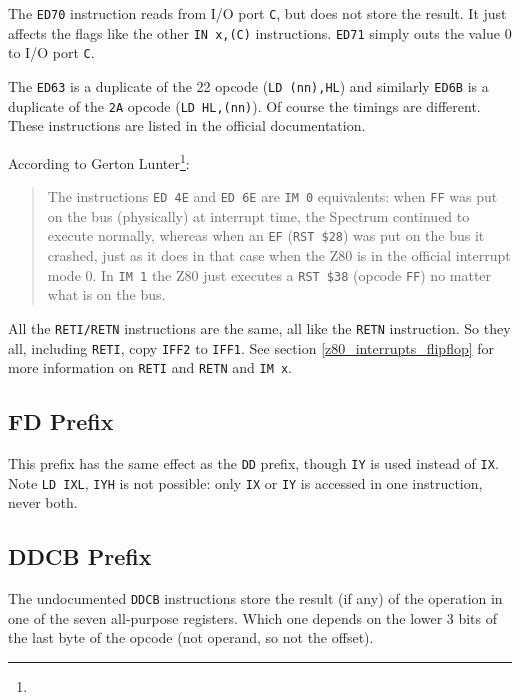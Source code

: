 The {\tt ED70} instruction reads from I/O port {\tt C}, but does not store the result. It just affects the flags like the other {\tt IN x,(C)} instructions. {\tt ED71} simply outs the value 0 to I/O port {\tt C}.

The {\tt ED63} is a duplicate of the 22 opcode ({\tt LD (nn),HL}) and similarly {\tt ED6B} is a duplicate of the {\tt 2A} opcode ({\tt LD HL,(nn)}). Of course the timings are different. These instructions are listed in the official documentation.

\pagebreak
According to Gerton Lunter\footnote{}:

\begin{quote}
	The instructions {\tt ED 4E} and {\tt ED 6E} are {\tt IM 0} equivalents: when {\tt FF} was put on the bus (physically) at interrupt time, the Spectrum continued to execute normally, whereas when an {\tt EF} ({\tt RST \$28}) was put on the bus it crashed, just as it does in that case when the Z80 is in the official interrupt mode 0. In {\tt IM 1} the Z80 just executes a {\tt RST \$38} (opcode {\tt FF}) no matter what is on the bus.
\end{quote}

All the {\tt RETI/RETN} instructions are the same, all like the {\tt RETN} instruction. So they all, including {\tt RETI}, copy {\tt IFF2} to {\tt IFF1}. See section \ref{z80_interrupts_flipflop} for more information on {\tt RETI} and {\tt RETN} and {\tt IM x}.


\subsection{FD Prefix \cite{gerton}}

This prefix has the same effect as the {\tt DD} prefix, though {\tt IY} is used instead of {\tt IX}.  Note {\tt LD IXL}, {\tt IYH} is not possible: only {\tt IX} or {\tt IY} is accessed in one instruction, never both.


\subsection{DDCB Prefix}
\label{z80_undocumented_prefix_cbdd}

The undocumented {\tt DDCB} instructions store the result (if any) of the operation in one of the seven all-purpose registers. Which one depends on the lower 3 bits of the last byte of the opcode (not operand, so not the offset).


